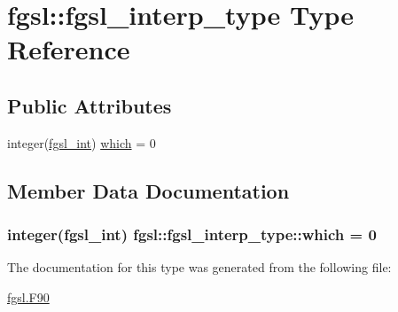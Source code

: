 \hypertarget{structfgsl_1_1fgsl__interp__type}{}\section{fgsl\+:\+:fgsl\+\_\+interp\+\_\+type Type Reference}
\label{structfgsl_1_1fgsl__interp__type}
\subsection*{Public Attributes}
\begin{DoxyCompactItemize}
\item 
integer(\hyperlink{namespacefgsl_a222deda1d7a0c0e845ce4a683318efeb}{fgsl\+\_\+int}) \hyperlink{structfgsl_1_1fgsl__interp__type_abedd1c0d310936d4ee2f422ed0cd51ed}{which} = 0
\end{DoxyCompactItemize}


\subsection{Member Data Documentation}
\hypertarget{structfgsl_1_1fgsl__interp__type_abedd1c0d310936d4ee2f422ed0cd51ed}{}
\subsubsection[{which}]{\setlength{\rightskip}{0pt plus 5cm}integer({\bf fgsl\+\_\+int}) fgsl\+::fgsl\+\_\+interp\+\_\+type\+::which = 0}\label{structfgsl_1_1fgsl__interp__type_abedd1c0d310936d4ee2f422ed0cd51ed}


The documentation for this type was generated from the following file\+:\begin{DoxyCompactItemize}
\item 
\hyperlink{fgsl_8F90}{fgsl.\+F90}\end{DoxyCompactItemize}

